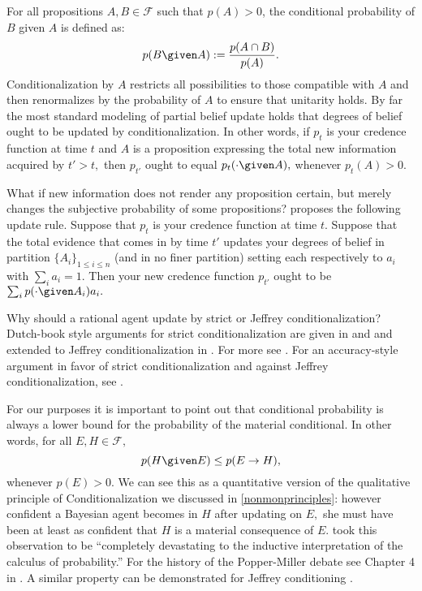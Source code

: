 For all propositions $A,B\in \mathcal{F}$ such that $p(A)>0$, the conditional
probability of $B$ given $A$ is defined as: $$p(B \given A) := \frac{p(A\cap
B)}{p(A)}.$$ Conditionalization by $A$ restricts all possibilities to those
compatible with $A$ and then renormalizes by the probability of $A$ to ensure
that unitarity holds. By far the most standard modeling of partial belief update
holds that degrees of belief ought to be updated by conditionalization. In other
words, if $p_t$ is your credence function at time $t$ and $A$ is a proposition
expressing the total new information acquired by $t'>t,$ then $p_{t'}$ ought to
equal $p_t(\cdot \given A),$ whenever $p_t(A)>0.$

What if new information does not render any proposition certain, but merely
changes the subjective probability of some propositions?
\citet{jeffrey1983logic} proposes the following update rule. Suppose that $p_t$
is your credence function at time $t$. Suppose that the total evidence that
comes in by time $t'$ updates your degrees of belief in partition
$\{A_i\}_{1\leq i \leq n}$ (and in no finer partition) setting each respectively
to $a_i$ with $\sum_i a_i = 1.$ Then your new credence function $p_{t'}$ ought
to be $\sum_i p(\cdot \given A_i) a_i.$ 

Why should a rational agent update by strict or Jeffrey conditionalization?
Dutch-book style arguments for strict conditionalization are given in
\citet{teller1973conditionalization} and \citet{lewis1999why} and extended to
Jeffrey conditionalization in \citet{armendt1980isthere}. For more see
\citet{skyrms2006diachronic}. For an accuracy-style argument in favor of strict
conditionalization and against Jeffrey conditionalization, see
\citet{leitgeb2010objective}.

For our purposes it is important to point out that conditional probability is
always a lower bound for the probability of the material conditional. In other
words, for all $E,H\in \mathcal{F},$ $$p(H \given E)\leq p(E\rightarrow H),$$
whenever $p(E)>0$. We can see this as a quantitative version of the qualitative
principle of Conditionalization we discussed in \autoref{nonmonprinciples}:
however confident a Bayesian agent becomes in $H$ after updating on $E,$ she
must have been at least as confident that $H$ is a material consequence of $E$.
\citet{popper1983proof} took this observation to be ``completely devastating to
the inductive interpretation of the calculus of probability.'' For the history of
the Popper-Miller debate see Chapter 4 in \citet{earman1992bayes}. A similar
property can be demonstrated for Jeffrey conditioning
\citep{genin2017howinductive}.

